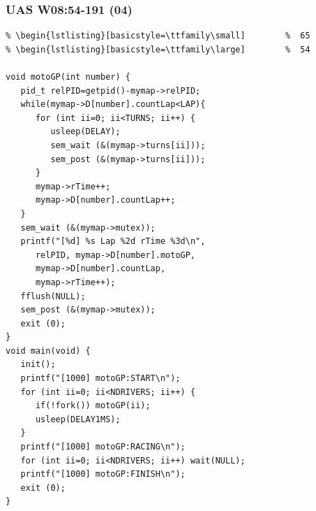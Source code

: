 \documentclass[aspectratio=169, xcolor=table, notheorems, hyperref={pdfpagelabels=false}]{beamer}
\begin{document}
\begin{frame}[fragile]
\frametitle{UAS W08:54-191 (04)}
\begin{lstlisting}[basicstyle=\ttfamily\tiny]         % 108
% \begin{lstlisting}[basicstyle=\ttfamily\footnotesize] %  72
% \begin{lstlisting}[basicstyle=\ttfamily\small]        %  65
% \begin{lstlisting}[basicstyle=\ttfamily\large]        %  54

void motoGP(int number) {
   pid_t relPID=getpid()-mymap->relPID;
   while(mymap->D[number].countLap<LAP){
      for (int ii=0; ii<TURNS; ii++) {
         usleep(DELAY);
         sem_wait (&(mymap->turns[ii]));
         sem_post (&(mymap->turns[ii]));
      }
      mymap->rTime++;
      mymap->D[number].countLap++;
   }
   sem_wait (&(mymap->mutex));
   printf("[%d] %s Lap %2d rTime %3d\n",
      relPID, mymap->D[number].motoGP,
      mymap->D[number].countLap,
      mymap->rTime++);
   fflush(NULL);
   sem_post (&(mymap->mutex));
   exit (0);
}
void main(void) {
   init();
   printf("[1000] motoGP:START\n");
   for (int ii=0; ii<NDRIVERS; ii++) {
      if(!fork()) motoGP(ii); 
      usleep(DELAY1MS);
   }
   printf("[1000] motoGP:RACING\n");
   for (int ii=0; ii<NDRIVERS; ii++) wait(NULL);
   printf("[1000] motoGP:FINISH\n");
   exit (0);
}

\end{lstlisting}
\end{frame}
\end{document}
